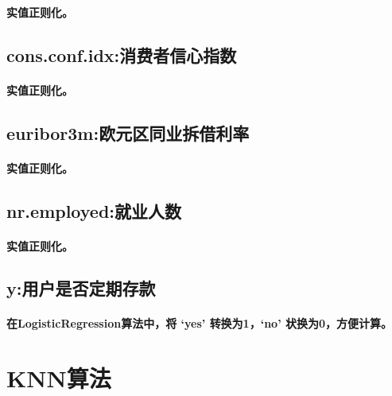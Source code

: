 \documentclass{ctexart}
\begin{document}
        \paragraph{
            实值正则化。
        }
        \subsection{cons.conf.idx:消费者信心指数}
        \paragraph{
            实值正则化。
        }
        \subsection{euribor3m:欧元区同业拆借利率}
        \paragraph{
            实值正则化。
        }
        \subsection{nr.employed:就业人数}
        \paragraph{
            实值正则化。
        }
        \subsection{y:用户是否定期存款}
        \paragraph{
            在LogisticRegression算法中，将 ‘yes’ 转换为1，‘no’ 状换为0，方便计算。
        }
    \section{KNN算法}
\end{document}
